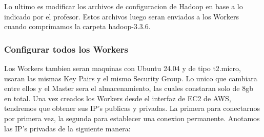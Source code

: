 \documentclass[9pt,letterpaper,twoside]{article}
\begin{document}
\begin{code}[H]
    
\end{code}

\newpage

\noindent
Lo ultimo es modificar los archivos de configuracion de Hadoop en base a lo indicado por el profesor. Estos archivos luego seran enviados a los Workers cuando comprimamos la carpeta hadoop-3.3.6.

\begin{code}[H]
    
\end{code}

\begin{code}[H]
    
\end{code}

\newpage

\begin{code}[H]
    
\end{code}

\begin{code}[H]
    
\end{code}

\newpage

\subsubsection*{Configurar todos los Workers}

\noindent
Los Workers tambien seran maquinas con Ubuntu 24.04 y de tipo t2.micro, usaran las mismas Key Pairs y el mismo Security Group.
Lo unico que cambiara entre ellos y el Master sera el almacenamiento, las cuales constaran solo de 8gb en total.
Una vez creados los Workers desde el interfaz de EC2 de AWS, tendremos que obtener sus IP's publicas y privadas. La primera
para conectarnos por primera vez, la segunda para establecer una conexion permanente.
Anotamos las IP's privadas de la siguiente manera:
\end{document}
